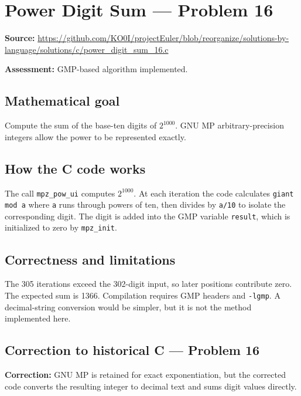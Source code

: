 \section{Power Digit Sum --- Problem 16}
\label{prob:16}
\noindent\textbf{Source:} \url{https://github.com/KO0I/projectEuler/blob/reorganize/solutions-by-language/solutions/c/power_digit_sum_16.c}

\noindent\textbf{Assessment:} GMP-based algorithm implemented.

\subsection*{Mathematical goal}
Compute the sum of the base-ten digits of \(2^{1000}\). GNU MP arbitrary-precision integers allow the power to be represented exactly.

\subsection*{How the C code works}
The call \verb|mpz_pow_ui| computes \(2^{1000}\). At each iteration the code calculates \verb|giant mod a| where \verb|a| runs through powers of ten, then divides by \verb|a/10| to isolate the corresponding digit. The digit is added into the GMP variable \verb|result|, which is initialized to zero by \verb|mpz_init|.

\subsection*{Correctness and limitations}
The 305 iterations exceed the 302-digit input, so later positions contribute zero. The expected sum is 1366. Compilation requires GMP headers and \verb|-lgmp|. A decimal-string conversion would be simpler, but it is not the method implemented here.


\subsection*{Correction to historical C --- Problem 16}
{\color{red}\textbf{Correction:} GNU MP is retained for exact exponentiation, but the corrected code converts the resulting integer to decimal text and sums digit values directly.}
